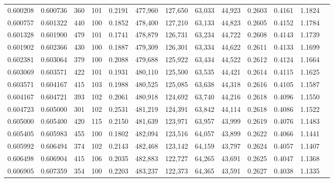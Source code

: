 \begin{tabular}{rrrrrrrrrrrrr}
0.600208 & 0.600736 &    360 &   101 &                                     0.2191 & 477,960 & 127,650 &  63,033 &  44,923 & 0.2603 & 0.4161 & 1.1824 \\
0.600757 & 0.601322 &    440 &   100 &                                     0.1852 & 478,400 & 127,210 &  63,133 &  44,823 & 0.2605 & 0.4152 & 1.1784 \\
0.601328 & 0.601900 &    479 &   101 &                                     0.1741 & 478,879 & 126,731 &  63,234 &  44,722 & 0.2608 & 0.4143 & 1.1739 \\
0.601902 & 0.602366 &    430 &   100 &                                     0.1887 & 479,309 & 126,301 &  63,334 &  44,622 & 0.2611 & 0.4133 & 1.1699 \\
0.602381 & 0.603064 &    379 &   100 &                                     0.2088 & 479,688 & 125,922 &  63,434 &  44,522 & 0.2612 & 0.4124 & 1.1664 \\
0.603069 & 0.603571 &    422 &   101 &                                     0.1931 & 480,110 & 125,500 &  63,535 &  44,421 & 0.2614 & 0.4115 & 1.1625 \\
0.603571 & 0.604167 &    415 &   103 &                                     0.1988 & 480,525 & 125,085 &  63,638 &  44,318 & 0.2616 & 0.4105 & 1.1587 \\
0.604167 & 0.604721 &    393 &   102 &                                     0.2061 & 480,918 & 124,692 &  63,740 &  44,216 & 0.2618 & 0.4096 & 1.1550 \\
0.604723 & 0.605000 &    301 &   102 &                                     0.2531 & 481,219 & 124,391 &  63,842 &  44,114 & 0.2618 & 0.4086 & 1.1522 \\
0.605000 & 0.605400 &    420 &   115 &                                     0.2150 & 481,639 & 123,971 &  63,957 &  43,999 & 0.2619 & 0.4076 & 1.1483 \\
0.605405 & 0.605983 &    455 &   100 &                                     0.1802 & 482,094 & 123,516 &  64,057 &  43,899 & 0.2622 & 0.4066 & 1.1441 \\
0.605992 & 0.606494 &    374 &   102 &                                     0.2143 & 482,468 & 123,142 &  64,159 &  43,797 & 0.2624 & 0.4057 & 1.1407 \\
0.606498 & 0.606904 &    415 &   106 &                                     0.2035 & 482,883 & 122,727 &  64,265 &  43,691 & 0.2625 & 0.4047 & 1.1368 \\
0.606905 & 0.607359 &    354 &   100 &                                     0.2203 & 483,237 & 122,373 &  64,365 &  43,591 & 0.2627 & 0.4038 & 1.1335 \\

\end{tabular}
